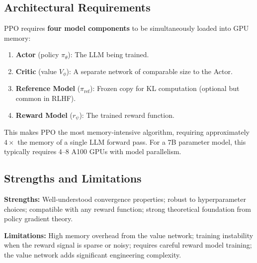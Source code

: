 \subsection{Architectural Requirements}

PPO requires \textbf{four model components} to be simultaneously loaded into GPU memory:
\begin{enumerate}[leftmargin=*, itemsep=1pt]
\item \textbf{Actor} (policy $\pi_\theta$): The LLM being trained.
\item \textbf{Critic} (value $V_\phi$): A separate network of comparable size to the Actor.
\item \textbf{Reference Model} ($\pi_{\text{ref}}$): Frozen copy for KL computation (optional but common in RLHF).
\item \textbf{Reward Model} ($r_\psi$): The trained reward function.
\end{enumerate}

This makes PPO the most memory-intensive algorithm, requiring approximately $4\times$ the memory of a single LLM forward pass. For a 7B parameter model, this typically requires 4--8 A100 GPUs with model parallelism.

\subsection{Strengths and Limitations}

\textbf{Strengths:} Well-understood convergence properties; robust to hyperparameter choices; compatible with any reward function; strong theoretical foundation from policy gradient theory.

\textbf{Limitations:} High memory overhead from the value network; training instability when the reward signal is sparse or noisy; requires careful reward model training; the value network adds significant engineering complexity.
